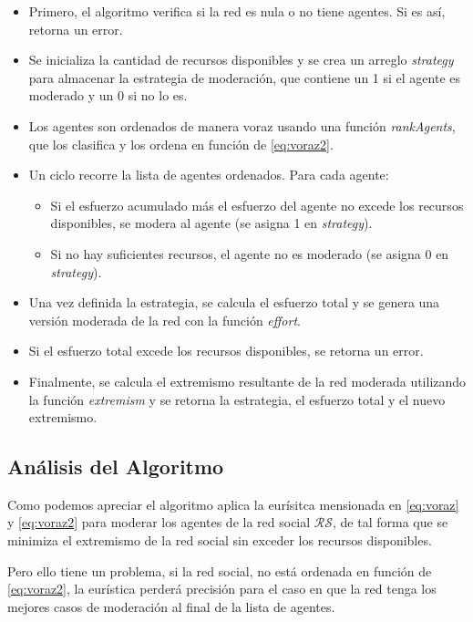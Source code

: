 \documentclass[letterpaper,10pt]{article}
\begin{document}
\begin{itemize}
  \item Primero, el algoritmo verifica si la red es nula o no tiene agentes. Si es así, retorna un error.
  \item Se inicializa la cantidad de recursos disponibles y se crea un arreglo \textit{strategy} para almacenar la estrategia de moderación, que contiene un 1 si el agente es moderado y un 0 si no lo es.
  \item Los agentes son ordenados de manera voraz usando una función \textit{rankAgents}, que los clasifica y los ordena en función de \eqref{eq:voraz2}.
  \item Un ciclo recorre la lista de agentes ordenados. Para cada agente:
  \begin{itemize}
    \item Si el esfuerzo acumulado más el esfuerzo del agente no excede los recursos disponibles, se modera al agente (se asigna 1 en \textit{strategy}).
    \item Si no hay suficientes recursos, el agente no es moderado (se asigna 0 en \textit{strategy}).
  \end{itemize}
  \item Una vez definida la estrategia, se calcula el esfuerzo total y se genera una versión moderada de la red con la función \textit{effort}.
  \item Si el esfuerzo total excede los recursos disponibles, se retorna un error.
  \item Finalmente, se calcula el extremismo resultante de la red moderada utilizando la función \textit{extremism} y se retorna la estrategia, el esfuerzo total y el nuevo extremismo.
\end{itemize}
\subsection{Análisis del Algoritmo}
\label{subsec:analisis_algoritmo_voraz}
Como podemos apreciar el algoritmo aplica la eurísitca mensionada en \eqref{eq:voraz} y \eqref{eq:voraz2} para moderar los agentes de la red social $\mathcal{R}\mathcal{S}$, de tal forma que se minimiza el extremismo de la red social sin exceder los recursos disponibles.

Pero ello tiene un problema, si la red social, no está ordenada en función de \eqref{eq:voraz2}, la eurística perderá precisión para el caso en que la red tenga los mejores casos de moderación al final de la lista de agentes.
\end{document}
